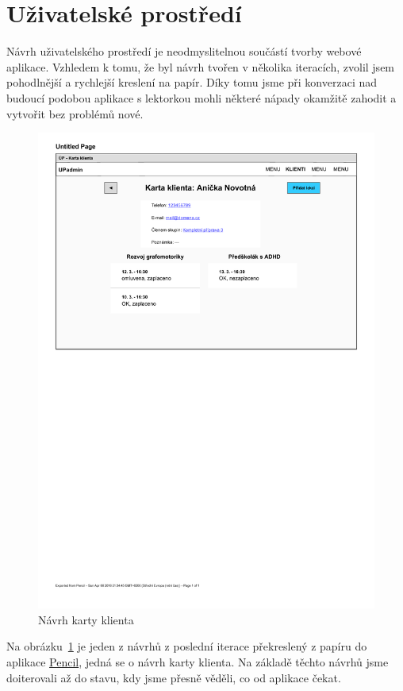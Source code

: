     \section{Uživatelské prostředí}
    Návrh uživatelského prostředí je neodmyslitelnou součástí tvorby webové aplikace. Vzhledem k tomu, že byl návrh tvořen v několika iteracích, zvolil jsem pohodlnější a rychlejší kreslení na papír. Díky tomu jsme při konverzaci nad budoucí podobou aplikace s lektorkou mohli některé nápady okamžitě zahodit a vytvořit bez problémů nové.
    
    \begin{figure}[ht]\centering
    	\includegraphics[width=1\textwidth]{img/ui-navrh}
    	\caption[Návrh karty klienta]{Návrh karty klienta}\label{fig:ui-navrh}
    \end{figure}
    
    Na obrázku~\ref{fig:ui-navrh} je jeden z návrhů z poslední iterace překreslený z papíru do aplikace \href{https://pencil.evolus.vn/}{Pencil}, jedná se o návrh karty klienta. Na základě těchto návrhů jsme doiterovali až do stavu, kdy jsme přesně věděli, co od aplikace čekat.
    
